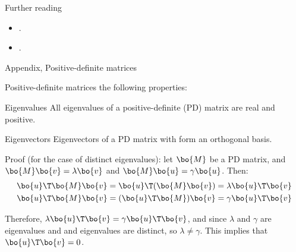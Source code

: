 \documentclass{beamer}
\begin{document}
\begin{frame}{Further reading}
	\begin{flushleft}
		
		\begin{itemize}
			\item {}.
			
			\item {}.
			
			
		\end{itemize}
		
		
	\end{flushleft}
\end{frame}


\myqrframe




\begin{frame}{Appendix, Positive-definite matrices}
	\begin{flushleft}
		
		Positive-definite matrices the following properties:
		
		\begin{block}{Eigenvalues}
			All eigenvalues of a positive-definite (PD) matrix are real and positive.
		\end{block}
		
		\begin{block}{Eigenvectors}
			Eigenvectors of a PD matrix with form an orthogonal basis.
		\end{block}
		
		Proof (for the case of distinct eigenvalues): let $\bo{M}$ be a PD matrix, and $\bo{M}\bo{v} = \lambda \bo{v}$ and  $\bo{M}\bo{u} = \gamma \bo{u}$. Then:
		\begin{align}
			\bo{u}\T\bo{M}\bo{v} = \bo{u}\T(\bo{M}\bo{v})= \lambda \bo{u}\T \bo{v} \\
			\bo{u}\T\bo{M}\bo{v} = (\bo{u}\T\bo{M})\bo{v}= \gamma \bo{u}\T \bo{v}
		\end{align}
		
		Therefore, $ \lambda \bo{u}\T \bo{v}= \gamma \bo{u}\T \bo{v}$, and since $\lambda$ and $ \gamma$ are eigenvalues and and eigenvalues are distinct, so $\lambda \neq \gamma$. This implies that $\bo{u}\T \bo{v} = 0$.
		
	\end{flushleft}
\end{frame}
\end{document}
